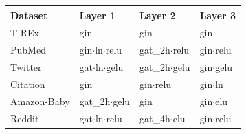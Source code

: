 \begin{tabular*}{\columnwidth}{@{\extracolsep{\fill}}llll@{}}
\toprule
\textbf{Dataset} & \textbf{Layer 1} & \textbf{Layer 2} & \textbf{Layer 3}\\
\midrule
T-REx & gin & gin & gin\\
PubMed & gin$\cdot$ln$\cdot$relu & gat\_2h$\cdot$relu & gin$\cdot$relu\\
Twitter & gat$\cdot$ln$\cdot$gelu & gat\_2h$\cdot$gelu & gin$\cdot$gelu\\
Citation & gin & gin$\cdot$relu & gin$\cdot$ln\\
Amazon-Baby & gat\_2h$\cdot$gelu & gin & gin$\cdot$elu\\
Reddit & gat$\cdot$ln$\cdot$relu & gat\_4h$\cdot$elu & gin$\cdot$relu\\
\bottomrule
\end{tabular*}

